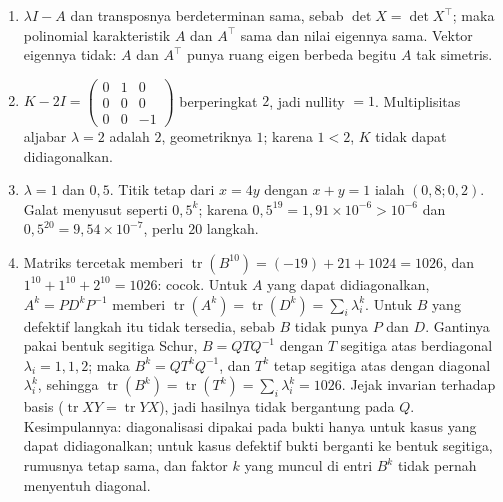 \begin{enumerate}[label=\textbf{9.\arabic*}]
  \item $\lambda I-A$ dan transposnya berdeterminan sama, sebab
        $\det X=\det X^{\top}$; maka polinomial karakteristik $A$ dan
        $A^{\top}$ sama dan nilai eigennya sama. Vektor eigennya tidak:
        $A$ dan $A^{\top}$ punya ruang eigen berbeda begitu $A$ tak simetris.

  \item $K-2I=\begin{pmatrix}0&1&0\\0&0&0\\0&0&-1\end{pmatrix}$ berperingkat $2$,
        jadi nullity $=1$. Multiplisitas aljabar $\lambda=2$ adalah $2$,
        geometriknya $1$; karena $1<2$, $K$ tidak dapat didiagonalkan.

  \item $\lambda=1$ dan $0{,}5$. Titik tetap dari $x=4y$ dengan $x+y=1$ ialah
        $(0{,}8;0{,}2)$. Galat menyusut seperti $0{,}5^{k}$; karena
        $0{,}5^{19}=1{,}91\times10^{-6}>\allowbreak10^{-6}$ dan
        $0{,}5^{20}=9{,}54\times10^{-7}$, perlu $20$ langkah.

  \item Matriks tercetak memberi
        $\operatorname{tr}(B^{10})=(-19)+21+1024=1026$, dan $1^{10}+1^{10}+2^{10}=1026$: cocok. Untuk $A$ yang
        dapat didiagonalkan, $A^{k}=PD^{k}P^{-1}$ memberi
        $\operatorname{tr}(A^{k})=\operatorname{tr}(D^{k})=\sum_{i}\lambda_{i}^{k}$.
        Untuk $B$ yang defektif langkah itu tidak tersedia, sebab $B$ tidak punya
        $P$ dan $D$. Gantinya pakai bentuk segitiga Schur, $B=QTQ^{-1}$ dengan $T$
        segitiga atas berdiagonal $\lambda_{i}=1,1,2$; maka $B^{k}=QT^{k}Q^{-1}$,
        dan $T^{k}$ tetap segitiga atas dengan diagonal $\lambda_{i}^{k}$, sehingga
        $\operatorname{tr}(B^{k})=\operatorname{tr}(T^{k})
        =\sum_{i}\lambda_{i}^{k}=1026$. Jejak invarian terhadap basis
        ($\operatorname{tr}XY=\operatorname{tr}YX$), jadi hasilnya tidak bergantung
        pada $Q$. Kesimpulannya: diagonalisasi dipakai pada bukti hanya untuk kasus
        yang dapat didiagonalkan; untuk kasus defektif bukti berganti ke bentuk
        segitiga, rumusnya tetap sama, dan faktor $k$ yang muncul di entri $B^{k}$
        tidak pernah menyentuh diagonal.
\end{enumerate}

